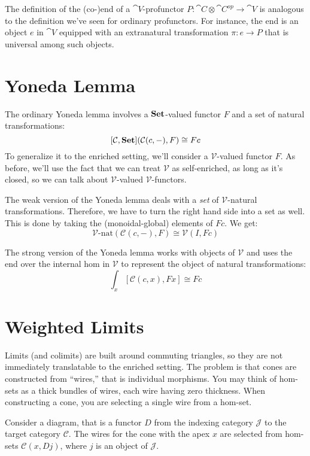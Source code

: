 \documentclass[DaoFP]{subfiles}
\begin{document}
The definition of the (co-)end of a $\cat V$-profunctor $P \colon \cat C \otimes \cat C^{op} \to \cat V$ is analogous to the definition we've seen for ordinary profunctors. For instance, the end is an object $e$ in $\cat V$ equipped with an extranatural transformation $\pi \colon e \to P$ that is universal among such objects. 

\section{Yoneda Lemma}

The ordinary Yoneda lemma involves a $\mathbf{Set}$-valued functor $F$ and a set of natural transformations:
\[ [\mathcal C, \mathbf{Set}]( \mathcal C(c, -), F) \cong F c \]
To generalize it to the enriched setting, we'll consider a $\mathcal V$-valued functor $F$. As before, we'll use the fact that we can treat $\mathcal V$ as self-enriched, as long as it's closed, so we can talk about $\mathcal V$-valued $\mathcal V$-functors. 

The weak version of the Yoneda lemma deals with a \emph{set} of $\mathcal V$-natural transformations. Therefore, we have to turn the right hand side into a set as well. This is done by taking the (monoidal-global) elements of $F c$. We get:
\[ \mathcal V\text{-nat} ( \mathcal C(c, -), F) \cong \mathcal V(I, F c) \]

The strong version of the Yoneda lemma works with objects of $\mathcal V$ and uses the end over the internal hom in $\mathcal V$ to represent the object of natural transformations:
\[ \int_x [\mathcal C( c, x), F x] \cong F c \]

\section{Weighted Limits}

Limits (and colimits) are built around commuting triangles, so they are not immediately translatable to the enriched setting. The problem is that cones are constructed from ``wires,'' that is individual morphisms. You may think of hom-sets as a thick bundles of wires, each wire having zero thickness. When constructing a cone, you are selecting a single wire from a hom-set. 

Consider a diagram, that is a functor $D$ from the indexing category $\mathcal J$ to the target category $\mathcal C$. The wires for the cone with the apex $x$ are selected from hom-sets $\mathcal C(x, D j)$, where $j$ is an object of $\mathcal J$. 
\end{document}
